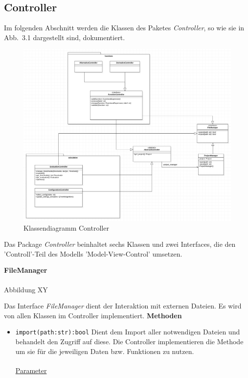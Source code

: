 \documentclass{article}
\begin{document}
\begin{itemize}
\newpage
\subsection{Controller}

Im folgenden Abschnitt werden die Klassen des Paketes \emph{Controller}, so wie sie in Abb.~3.1 dargestellt sind, dokumentiert.

\begin{figure}[H]%
    \centering
    \includegraphics[width=13cm]{entwurf/Entwurf_dokument/img/Floriane/ControllerklassendiagrammTemporaer.png}
    \caption{Klassendiagramm Controller}
\end{figure}

Das Package \textit{Controller} beinhaltet sechs Klassen und zwei Interfaces, die den 'Controll'-Teil des Modells 'Model-View-Control' umsetzen.

\newpage
\textbf{\large{FileManager}}\\\\
Abbildung XY

Das Interface \textit{FileManager} dient der Interaktion mit externen Dateien. Es wird von allen Klassen im Controller implementiert.
\newline \newline
\textbf{{Methoden}}
\begin{itemize}
\item \texttt{import(path:str):bool} \newline Dient dem Import aller notwendigen Dateien und behandelt den Zugriff auf diese. Die Controller implementieren die Methode um sie für die jeweiligen Daten bzw. Funktionen zu nutzen.
\\\\
\underline{{Parameter}}


\end{itemize}
\end{itemize}
\end{document}

